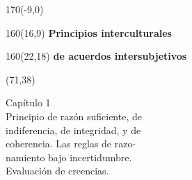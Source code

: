 \documentclass[shownotes,aspectratio=169]{beamer}
\begin{document}
\begin{frame}
\begin{textblock}{170}(-9,0)
\end{textblock}

\begin{textblock}{160}(16,9)
\LARGE \textcolor{black!5}{\fontsize{22}{0}\selectfont \textbf{Principios interculturales}}
\end{textblock}
\begin{textblock}{160}(22,18)
\LARGE \textcolor{black!5}{\fontsize{22}{0}\selectfont \textbf{de acuerdos intersubjetivos}}
\end{textblock}


\begin{textblock}{55}(71,38)
\begin{turn}{33}
\parbox{6cm}{
\textcolor{black!5}{\hspace{-0.3cm}Capítulo 1} \\
\small\textcolor{black!5}{\hspace{-0.1cm}Principio de razón suficiente, de}\\
\small\textcolor{black!5}{indiferencia, de integridad, y de} \\
\small\textcolor{black!5}{\hspace{0.1cm}coherencia. Las reglas de razo-} \\ \small\textcolor{black!5}{\hspace{0.2cm}namiento bajo incertidumbre.} \\
\small\textcolor{black!5}{\hspace{0.36cm}Evaluación de creencias.} \\
}
\end{turn}
\end{textblock}

\end{frame}
\end{document}

